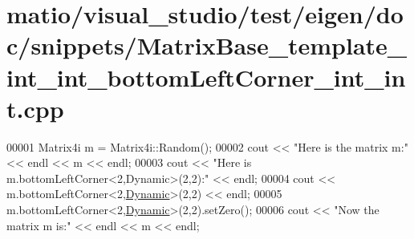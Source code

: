 \hypertarget{matio_2visual__studio_2test_2eigen_2doc_2snippets_2_matrix_base__template__int__int__bottom_left_corner__int__int_8cpp_source}{}\section{matio/visual\+\_\+studio/test/eigen/doc/snippets/\+Matrix\+Base\+\_\+template\+\_\+int\+\_\+int\+\_\+bottom\+Left\+Corner\+\_\+int\+\_\+int.cpp}
\label{matio_2visual__studio_2test_2eigen_2doc_2snippets_2_matrix_base__template__int__int__bottom_left_corner__int__int_8cpp_source}

\begin{DoxyCode}
00001 Matrix4i m = Matrix4i::Random();
00002 cout << \textcolor{stringliteral}{"Here is the matrix m:"} << endl << m << endl;
00003 cout << \textcolor{stringliteral}{"Here is m.bottomLeftCorner<2,Dynamic>(2,2):"} << endl;
00004 cout << m.bottomLeftCorner<2,\hyperlink{namespace_eigen_ad81fa7195215a0ce30017dfac309f0b2}{Dynamic}>(2,2) << endl;
00005 m.bottomLeftCorner<2,\hyperlink{namespace_eigen_ad81fa7195215a0ce30017dfac309f0b2}{Dynamic}>(2,2).setZero();
00006 cout << \textcolor{stringliteral}{"Now the matrix m is:"} << endl << m << endl;
\end{DoxyCode}
